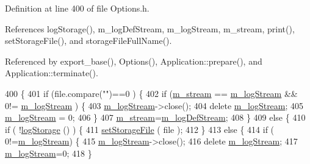 Definition at line 400 of file Options.\+h.



References log\+Storage(), m\+\_\+log\+Def\+Stream, m\+\_\+log\+Stream, m\+\_\+stream, print(), set\+Storage\+File(), and storage\+File\+Full\+Name().



Referenced by export\+\_\+base(), Options(), Application\+::prepare(), and Application\+::terminate().


\begin{DoxyCode}
400                                                         \{
401                 \textcolor{keywordflow}{if} (file.compare(\textcolor{stringliteral}{""})==0 ) \{
402                         \textcolor{keywordflow}{if} (\hyperlink{classOptions_a8c5485cd614fa90de6b1aa85a7d2191b}{m\_stream} == \hyperlink{classOptions_a65c3a025880fb38373b599b87d600eef}{m\_logStream} && 0!=
      \hyperlink{classOptions_a65c3a025880fb38373b599b87d600eef}{m\_logStream} ) \{
403                                 \hyperlink{classOptions_a65c3a025880fb38373b599b87d600eef}{m\_logStream}->close();
404                                 \textcolor{keyword}{delete} \hyperlink{classOptions_a65c3a025880fb38373b599b87d600eef}{m\_logStream};
405                                 \hyperlink{classOptions_a65c3a025880fb38373b599b87d600eef}{m\_logStream} = 0;
406                         \}
407                         \hyperlink{classOptions_a8c5485cd614fa90de6b1aa85a7d2191b}{m\_stream}=\hyperlink{classOptions_aebb2db3fb07ea1f73b27bde841be69d8}{m\_logDefStream};
408                 \}
409                 \textcolor{keywordflow}{else} \{
410                         \textcolor{keywordflow}{if} ( !\hyperlink{classOptions_a33735fffe17485937ab7579d8716b7ee}{logStorage} () ) \{
411                                 \hyperlink{classOptions_ac163281337998af5ca3b7a9617337fef}{setStorageFile} ( file );
412                         \}
413                         \textcolor{keywordflow}{else} \{
414                                 \textcolor{keywordflow}{if} ( 0!=\hyperlink{classOptions_a65c3a025880fb38373b599b87d600eef}{m\_logStream}) \{
415                                         \hyperlink{classOptions_a65c3a025880fb38373b599b87d600eef}{m\_logStream}->close();
416                                         \textcolor{keyword}{delete} \hyperlink{classOptions_a65c3a025880fb38373b599b87d600eef}{m\_logStream};
417                                         \hyperlink{classOptions_a65c3a025880fb38373b599b87d600eef}{m\_logStream}=0;
418                                 \}

\end{DoxyCode}
